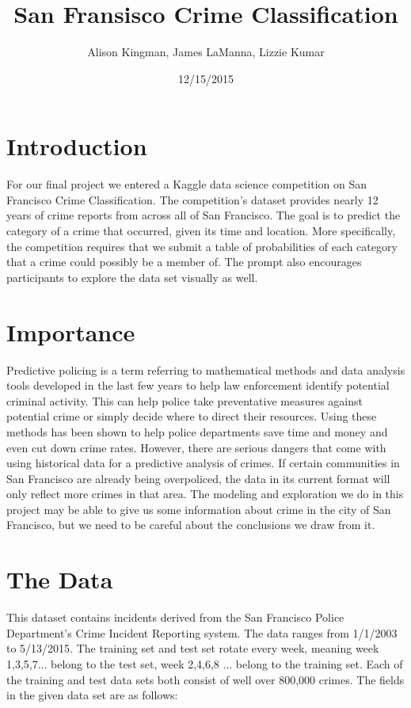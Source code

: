 \documentclass[11pt]{article}
\title{San Fransisco Crime Classification}
\author{Alison Kingman, James LaManna, Lizzie Kumar}
\date{12/15/2015}
\begin{document}


\maketitle

\section*{Introduction}

For our final project we entered a Kaggle data science competition on San Francisco Crime Classification. The competition's dataset provides nearly 12 years of crime reports from across all of San Francisco. The goal is to predict the category of a crime that occurred, given its time and location. More specifically, the competition requires that we submit a table of probabilities of each category that a crime could possibly be a member of.  The prompt also encourages participants to explore the data set visually as well.	
 
\section*{Importance}

 Predictive policing is a term referring to mathematical methods and data analysis tools developed in the last few years to help law enforcement identify potential criminal activity. This can help police take preventative measures against potential crime or simply decide where to direct their resources. Using these methods has been shown to help police departments save time and money and even cut down crime rates. However, there are serious dangers that come with using historical data for a predictive analysis of crimes. If certain communities in San Francisco are already being overpoliced, the data in its current format will only reflect more crimes in that area. The modeling and exploration we do in this project may be able to give us some information about crime in the city of San Francisco, but we need to be careful about the conclusions we draw from it.

\section*{The Data}

This dataset contains incidents derived from the San Francisco Police Department's Crime Incident Reporting system. The data ranges from 1/1/2003 to 5/13/2015. The training set and test set rotate every week, meaning week 1,3,5,7... belong to the test set, week 2,4,6,8 ... belong to the training set.  Each of the training and test data sets both consist of well over 800,000 crimes. The fields in the given data set are as follows: 
 
\end{document}
